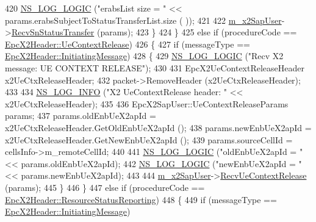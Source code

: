\begin{DoxyCode}
420             \hyperlink{group__logging_ga88acd260151caf2db9c0fc84997f45ce}{NS\_LOG\_LOGIC} (\textcolor{stringliteral}{"erabsList size = "} << params.erabsSubjectToStatusTransferList.size (
      ));
421 
422             \hyperlink{classns3_1_1EpcX2_a0a74a3c19067fe18af3021c7b4c24c19}{m\_x2SapUser}->\hyperlink{classns3_1_1EpcX2SapUser_a261f30dd348d5abc9a270ef904c986c0}{RecvSnStatusTransfer} (params);
423         \}
424     \}
425   \textcolor{keywordflow}{else} \textcolor{keywordflow}{if} (procedureCode == \hyperlink{classns3_1_1EpcX2Header_afd178c1ed3c47948c587955698a15b0dafaf7b3969cec8182c5b3843d2113bbcc}{EpcX2Header::UeContextRelease})
426     \{
427       \textcolor{keywordflow}{if} (messageType == \hyperlink{classns3_1_1EpcX2Header_a0e69b043a20eaee4c570f223f4eca715a5761e50c3c1918a44e3a5ebc86f17435}{EpcX2Header::InitiatingMessage})
428         \{
429           \hyperlink{group__logging_ga88acd260151caf2db9c0fc84997f45ce}{NS\_LOG\_LOGIC} (\textcolor{stringliteral}{"Recv X2 message: UE CONTEXT RELEASE"});
430 
431           EpcX2UeContextReleaseHeader x2UeCtxReleaseHeader;
432           packet->RemoveHeader (x2UeCtxReleaseHeader);
433 
434           \hyperlink{group__logging_gafbd73ee2cf9f26b319f49086d8e860fb}{NS\_LOG\_INFO} (\textcolor{stringliteral}{"X2 UeContextRelease header: "} << x2UeCtxReleaseHeader);
435 
436           EpcX2SapUser::UeContextReleaseParams params;
437           params.oldEnbUeX2apId = x2UeCtxReleaseHeader.GetOldEnbUeX2apId ();
438           params.newEnbUeX2apId = x2UeCtxReleaseHeader.GetNewEnbUeX2apId ();
439           params.sourceCellId = cellsInfo->m\_remoteCellId;
440 
441           \hyperlink{group__logging_ga88acd260151caf2db9c0fc84997f45ce}{NS\_LOG\_LOGIC} (\textcolor{stringliteral}{"oldEnbUeX2apId = "} << params.oldEnbUeX2apId);
442           \hyperlink{group__logging_ga88acd260151caf2db9c0fc84997f45ce}{NS\_LOG\_LOGIC} (\textcolor{stringliteral}{"newEnbUeX2apId = "} << params.newEnbUeX2apId);
443 
444           \hyperlink{classns3_1_1EpcX2_a0a74a3c19067fe18af3021c7b4c24c19}{m\_x2SapUser}->\hyperlink{classns3_1_1EpcX2SapUser_a141e3d6880234990ccde32a16554e7d6}{RecvUeContextRelease} (params);
445         \}
446     \}
447   \textcolor{keywordflow}{else} \textcolor{keywordflow}{if} (procedureCode == \hyperlink{classns3_1_1EpcX2Header_afd178c1ed3c47948c587955698a15b0da6761ec564ade1c9d61cfd1dc590535d0}{EpcX2Header::ResourceStatusReporting})
448     \{
449       \textcolor{keywordflow}{if} (messageType == \hyperlink{classns3_1_1EpcX2Header_a0e69b043a20eaee4c570f223f4eca715a5761e50c3c1918a44e3a5ebc86f17435}{EpcX2Header::InitiatingMessage})

\end{DoxyCode}
